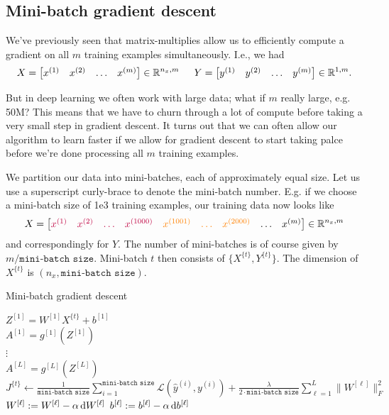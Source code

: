 \documentclass[12pt]{article}
\begin{document}
\subsection{Mini-batch gradient descent}
We've previously seen that matrix-multiplies allow us to efficiently compute a gradient on all $m$ training examples simultaneously. I.e., we had
\begin{equation}
  X = \begin{bmatrix}     x^{(1)} & x^{(2)} & \ldots & x^{(m)}   \end{bmatrix} \in \mathbb R^{n_x, m} \\ \hspace{15pt}
  Y = \begin{bmatrix}     y^{(1)} & y^{(2)} & \ldots & y^{(m)}   \end{bmatrix} \in \mathbb R^{1, m}.
\end{equation}

But in deep learning we often work with large data; 
what if $m$ really large, e.g. 50M? This means that we have to churn through a lot of compute before taking a very small step in gradient descent. It turns out that we can often allow our algorithm to learn faster if we allow for gradient descent to start taking palce before we're done processing all $m$ training examples.

We partition our data into mini-batches, 
each of approximately equal size. Let us use a superscript curly-brace to denote the mini-batch number. E.g. if we choose a mini-batch size of 1e3 training examples, 
our training data now looks like
\[
  X = \begin{bmatrix}       \color{purple} x^{(1)} & \color{purple} x^{(2)} & \color{purple} \ldots & \color{purple} x^{(1000)}      & \color{orange} x^{(1001)} & \color{orange} \ldots & \color{orange} x^{(2000)} & \color{black} \ldots & x^{(m)}   \end{bmatrix} \in \mathbb R^{n_x, m}
\]
and correspondingly for $Y$.
The number of mini-batches is of course given by $m/\texttt{mini-batch size}$. Mini-batch $t$ then consists of $\{X^{\{t\}}, Y^{\{t\}}\}$. The dimension of $X^{\{t\}}$ is $(n_x, \texttt{mini-batch size})$.

\begin{algorithm}[h]   \caption{Mini-batch gradient descent}
   {
    $Z^{[1]} = W^{[1]} X^{\{t\}} + b^{[1]}$ \\
    $A^{[1]} = g^{[1]}(Z^{[1]})$ \\
    $\vdots$ \\
    $A^{[L]} = g^{[L]}(Z^{[L]})$
    $J^{\{t\}} \gets \frac{1}{\texttt{mini-batch size}} \sum_{i=1}^{\texttt{mini-batch size}} \mathcal L(\hat y^{(i)}, y^{(i)}) + \frac{\lambda}{2 \cdot \texttt{mini-batch size}} \sum_{\ell = 1}^{L} \|W^{[\ell]}\|_F^2$ \\
    $W^{[\ell]} := W^{[\ell]} - \alpha \operatorname{d}\!{W}^{[\ell]}$
    $b^{[\ell]} := b^{[\ell]} - \alpha \operatorname{d}\!{b}^{[\ell]}$
  } \end{algorithm}
\end{document}
